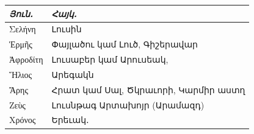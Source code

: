 \documentclass{article}
\begin{document}
\begin{table}[H]
    \centering
    \arm
    \small
    \begin{tabular}{l l}
        \emph{Յուն․}   &  \emph{Հայկ․}                              \\ \hline
         Σελήνη    &  Լուսին                               \\ 
         Ἑρμῆς     &  Փայլածու կամ Լուծ, Գիշերավար         \\
         Ἀφροδίτη  &  Լուսաբեր կամ Արուսեակ,               \\
         Ἥλιος     &  Արեգակն                              \\
         Ἄρης      &  Հրատ կամ Սալ, Ծկրաւորի, Կարմիր աստղ  \\
         Ζεὺς      &  Լուսնթագ Արտախոյր (Արամազդ)          \\
         Χρόνος    &  Երեւակ․ \\
    \end{tabular}
\end{table}
\end{document}
